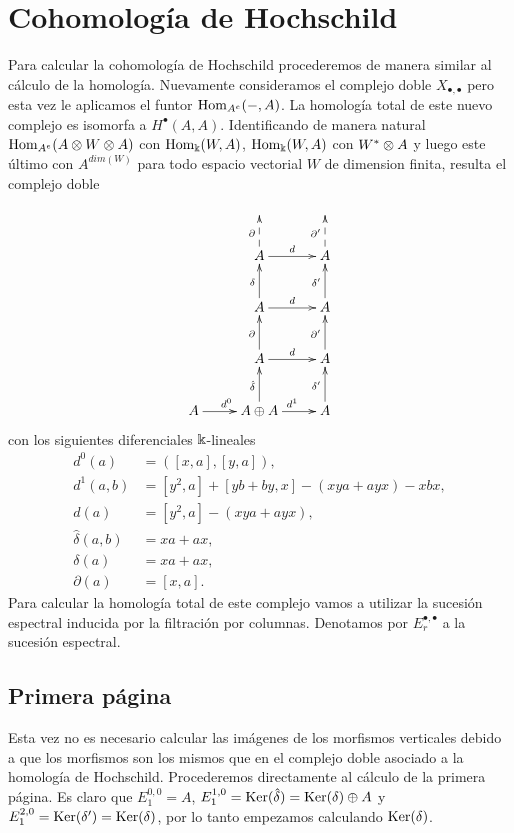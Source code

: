 \documentclass[fleqn,../tesis.tex]{subfiles}
\begin{document}
\section{Cohomología de Hochschild}\label{cohomología_de_hochschild}
Para calcular la cohomología de Hochschild procederemos de manera similar al cálculo de la homología. Nuevamente consideramos
el complejo doble $X_{\bullet, \bullet}$ pero esta vez le aplicamos el funtor $\operatorname{Hom}_{A^e}(-, A)$. La homología total
de este nuevo complejo es isomorfa a $H^{\bullet}(A, A)$. Identificando de manera natural $\operatorname{Hom}_{A^{e}}(A\otimes W \otimes A)$ con
$\operatorname{Hom}_{\Bbbk}(W, A)$, $\operatorname{Hom}_{\Bbbk}(W, A)$ con $W^{\ast}\otimes A$ y luego este último con $A^{dim(W)}$ para todo
espacio vectorial $W$ de dimension finita, resulta el complejo doble
\begin{align*}
\xymatrix{
	& & \\
	& A \ar@{-->}[u]^{\partial} \ar[r]^{d} & A \ar@{-->}[u]^{\partial'} \\
    & A \ar[u]^{\delta} \ar[r]^{d} & A \ar[u]^{\delta'} \\
    & A \ar[u]^{\partial} \ar[r]^{d} & A \ar[u]^{\partial'} \\
    A \ar[r]^{d^{0}} &A \oplus A \ar[r]^{d^{1}} \ar[u]^{\hat{\delta}} & A \ar[u]^{\delta'}
} 
\end{align*}
con los siguientes diferenciales $\Bbbk$-lineales
\begin{align*}
    d^{0}(a) &= \left([x, a], [y,a]\right),\\
    d^{1}(a, b) &= [y^2, a] + [yb + by, x] - (xya + ayx) - xbx,\\
    d(a) &= [y^2, a] - (xya + ayx),\\
    \hat{\delta}(a, b) &= xa + ax,\\
    \delta(a) &= xa + ax,\\
    \partial(a) &= [x, a].
\end{align*}
Para calcular la homología total de este complejo vamos a utilizar la sucesión espectral inducida por la filtración por columnas.
Denotamos por $E^{\bullet, \bullet}_{r}$ a la sucesión espectral.

\subsection{Primera página}
Esta vez no es necesario calcular las imágenes de los morfismos verticales
debido a que los morfismos son los mismos que en el complejo doble asociado a la homología de Hochschild. Procederemos directamente al cálculo de la primera página.
Es claro que $E^{0, 0}_{1} = A$, $E^{1, 0}_{1} = \operatorname{Ker}(\hat{\delta}) = \operatorname{Ker}(\delta)\oplus A$ y $E^{2, 0}_{1} = \operatorname{Ker}(\delta') = \operatorname{Ker}(\delta)$,
por lo tanto empezamos calculando $\operatorname{Ker}(\delta)$.
\end{document}
